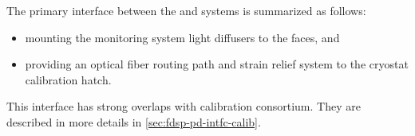 



The primary interface between the and  systems is summarized as follows:
\begin{itemize}
    \item mounting the  monitoring system light diffusers to the  faces, and 
    \item providing an optical fiber routing path and strain relief system to the cryostat calibration hatch.
\end{itemize} 

This interface has strong overlaps with calibration consortium. They are described in more details in \ref{sec:fdsp-pd-intfc-calib}.



